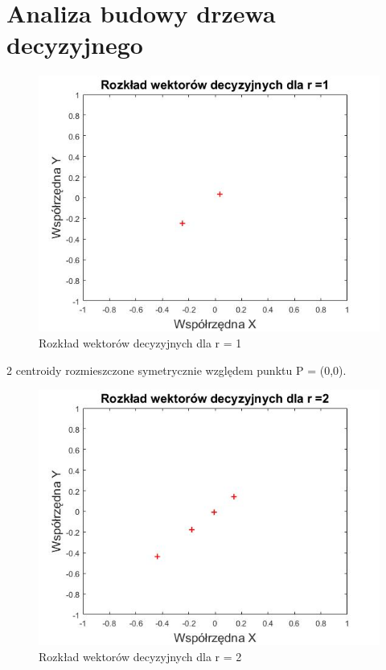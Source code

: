 \documentclass[12pt, a4paper, oneside]{article}
\begin{document}
\section{Analiza budowy drzewa decyzyjnego}
\begin{figure}[h!]
\centering
\caption{Rozkład wektorów decyzyjnych dla r = 1}
\includegraphics[scale=0.65]{pics/f1}
\end{figure}
\begin{center}
2 centroidy rozmieszczone symetrycznie względem punktu P = (0,0).
\end{center}
\begin{figure}[h!]
\centering
\caption{Rozkład wektorów decyzyjnych dla r = 2}
\includegraphics[scale=0.65]{pics/f2}
\end{figure}
\end{document}
